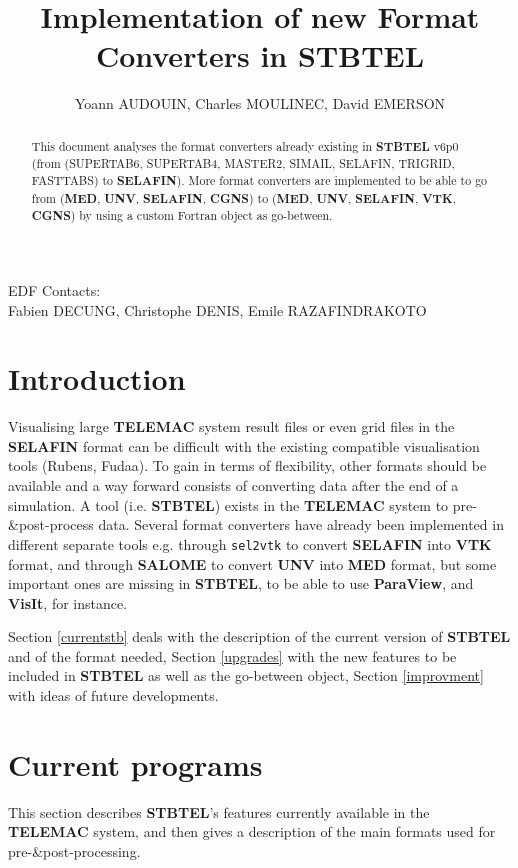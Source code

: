 \documentclass[a4paper,10pt]{article}
\newcommand{\tel}{\textbf{TELEMAC}\xspace}
\newcommand{\stb}{\textbf{STBTEL}\xspace}
\newcommand{\slf}{\textbf{SELAFIN}\xspace}
\newcommand{\sal}{\textbf{SALOME}\xspace}
\newcommand{\unv}{\textbf{UNV}\xspace}
\newcommand{\med}{\textbf{MED}\xspace}
\newcommand{\vtk}{\textbf{VTK}\xspace}
\newcommand{\cgns}{\textbf{CGNS}\xspace}
\begin{document}
\title{Implementation of new Format Converters in \stb}
\author{Yoann AUDOUIN, Charles MOULINEC, David EMERSON}


\maketitle
\begin{abstract}
This document analyses the format converters already existing in \stb v6p0 (from 
(SUPERTAB6, SUPERTAB4, MASTER2, SIMAIL, SELAFIN, TRIGRID, FASTTABS) to \slf).
More format converters are implemented to be able to
go from (\med, \unv, \slf, \cgns) to (\med, \unv, \slf, \vtk, \cgns) by using a
custom Fortran object as go-between.
\end{abstract}
\vfill
EDF Contacts: \\
Fabien DECUNG, Christophe DENIS, Emile RAZAFINDRAKOTO
\newpage

\section{Introduction}
Visualising large \tel system\cite{telemac} result files or even grid files in
the \slf format can be difficult with the existing compatible visualisation
tools (Rubens, Fudaa). To gain in terms of flexibility, other formats should be
available and a way forward consists of converting data after the end of a
simulation.
A tool (i.e. \stb) exists in the \tel system to pre-\&post-process data.
Several format converters have already been implemented in different separate
tools e.g. through \verb+sel2vtk+ to convert \slf into \vtk format, and through
\sal\cite{salome} to convert \unv into \med format, but some important ones are
missing in \stb, to be able to use \textbf{ParaView}\cite{paraview}, and
\textbf{VisIt}\cite{visit}, for instance.

Section \ref{currentstb} deals with the description of the current version of
\stb and of the format needed, 
Section \ref{upgrades} with the new features to be included in \stb as well as
the go-between object, 
Section \ref{improvment} with ideas of future developments.

\section{\label{currentstb}Current programs}
This section describes \stb's features currently available in the \tel system,
and then gives a description of the main formats used for
pre-\&post-processing.
\end{document}
